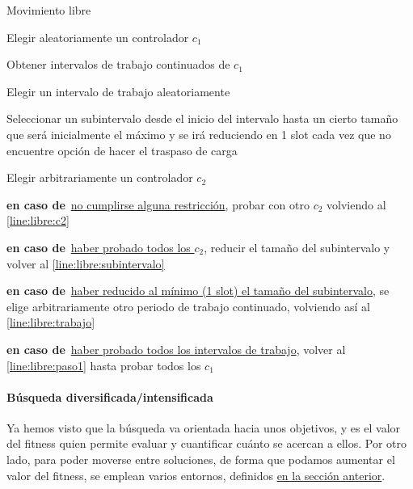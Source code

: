 \begin{algorithm}[h]
    \label{algoritmo:movLibre}
    
   	\caption{Movimiento libre}
    	
    \SetAlgoNoEnd
    Elegir aleatoriamente un controlador $c_1$  \label{line:libre:paso1}\;
    \algovspace

    Obtener intervalos de trabajo continuados de $c_1$\;
    \algovspace

    Elegir un intervalo de trabajo aleatoriamente \label{line:libre:trabajo}\;
    \algovspace

    Seleccionar un subintervalo desde el inicio del intervalo hasta un cierto tamaño que será inicialmente el máximo y se irá reduciendo en 1 slot \newline cada vez que no encuentre opción de hacer el traspaso de carga \label{line:libre:subintervalo}\;
    \algovspace

    Elegir arbitrariamente un controlador $c_2$ \label{line:libre:c2}\;
    \algovspace

    \algovspace

    \textbf{en caso de\,} \underline{no cumplirse alguna restricción}, probar con otro $c_2$ volviendo al \autoref{line:libre:c2}\;
    \algovspace

    \textbf{en caso de\,} \underline{haber probado todos los $c_2$}, reducir el tamaño del subintervalo y volver al \autoref{line:libre:subintervalo}\;
    \algovspace

    \textbf{en caso de\,} \underline{haber reducido al mínimo (1 slot) el tamaño del subintervalo}, se elige arbitrariamente otro periodo de trabajo continuado, volviendo así al \autoref{line:libre:trabajo}\;
    \algovspace

    \textbf{en caso de\,} \underline{haber probado todos los intervalos de trabajo}, volver al \autoref{line:libre:paso1} hasta probar todos los $c_1$\;
    \algovspace
\end{algorithm}


\paragraph{Búsqueda diversificada/intensificada} \label{capitulo:3:busqueda-divers-intens}
Ya hemos visto que la búsqueda va orientada hacia unos objetivos, y es el valor del fitness quien permite evaluar y cuantificar cuánto se acercan a ellos. Por otro lado, para poder moverse entre soluciones, de forma que podamos aumentar
el valor del fitness, se emplean varios entornos, definidos \hyperref[paragraph:entornos]{en la sección anterior}.

